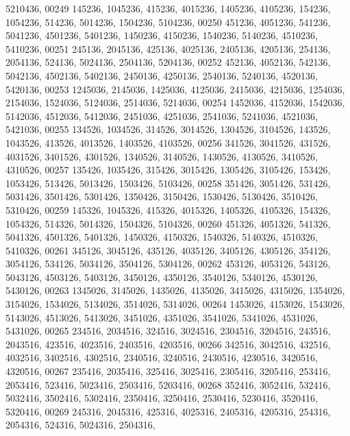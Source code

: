 \begin{DoxyCode}
      5210436,
00249        145236, 1045236,  415236, 4015236, 1405236, 4105236,  154236, 1054236,  514236, 5014236, 1504236, 
      5104236,
00250        451236, 4051236,  541236, 5041236, 4501236, 5401236, 1450236, 4150236, 1540236, 5140236, 4510236, 
      5410236,
00251        245136, 2045136,  425136, 4025136, 2405136, 4205136,  254136, 2054136,  524136, 5024136, 2504136, 
      5204136,
00252        452136, 4052136,  542136, 5042136, 4502136, 5402136, 2450136, 4250136, 2540136, 5240136, 4520136, 
      5420136,
00253       1245036, 2145036, 1425036, 4125036, 2415036, 4215036, 1254036, 2154036, 1524036, 5124036, 2514036, 
      5214036,
00254       1452036, 4152036, 1542036, 5142036, 4512036, 5412036, 2451036, 4251036, 2541036, 5241036, 4521036, 
      5421036,
00255        134526, 1034526,  314526, 3014526, 1304526, 3104526,  143526, 1043526,  413526, 4013526, 1403526, 
      4103526,
00256        341526, 3041526,  431526, 4031526, 3401526, 4301526, 1340526, 3140526, 1430526, 4130526, 3410526, 
      4310526,
00257        135426, 1035426,  315426, 3015426, 1305426, 3105426,  153426, 1053426,  513426, 5013426, 1503426, 
      5103426,
00258        351426, 3051426,  531426, 5031426, 3501426, 5301426, 1350426, 3150426, 1530426, 5130426, 3510426, 
      5310426,
00259        145326, 1045326,  415326, 4015326, 1405326, 4105326,  154326, 1054326,  514326, 5014326, 1504326, 
      5104326,
00260        451326, 4051326,  541326, 5041326, 4501326, 5401326, 1450326, 4150326, 1540326, 5140326, 4510326, 
      5410326,
00261        345126, 3045126,  435126, 4035126, 3405126, 4305126,  354126, 3054126,  534126, 5034126, 3504126, 
      5304126,
00262        453126, 4053126,  543126, 5043126, 4503126, 5403126, 3450126, 4350126, 3540126, 5340126, 4530126, 
      5430126,
00263       1345026, 3145026, 1435026, 4135026, 3415026, 4315026, 1354026, 3154026, 1534026, 5134026, 3514026, 
      5314026,
00264       1453026, 4153026, 1543026, 5143026, 4513026, 5413026, 3451026, 4351026, 3541026, 5341026, 4531026, 
      5431026,
00265        234516, 2034516,  324516, 3024516, 2304516, 3204516,  243516, 2043516,  423516, 4023516, 2403516, 
      4203516,
00266        342516, 3042516,  432516, 4032516, 3402516, 4302516, 2340516, 3240516, 2430516, 4230516, 3420516, 
      4320516,
00267        235416, 2035416,  325416, 3025416, 2305416, 3205416,  253416, 2053416,  523416, 5023416, 2503416, 
      5203416,
00268        352416, 3052416,  532416, 5032416, 3502416, 5302416, 2350416, 3250416, 2530416, 5230416, 3520416, 
      5320416,
00269        245316, 2045316,  425316, 4025316, 2405316, 4205316,  254316, 2054316,  524316, 5024316, 2504316, 

\end{DoxyCode}
